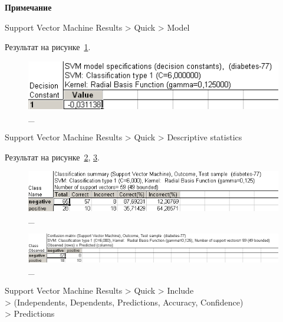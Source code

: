 \newpage

\begin{center}
  \textbf{Примечание}
\end{center}

Support Vector Machine Results > Quick > Model

Результат на рисунке~\ref{fig:v5_14}.

\begin{figure}[!h]
  \centering

  \includegraphics[width=12cm]
  {inc/v5_14.PNG}

  \caption{\_}

  \label{fig:v5_14}
\end{figure}

Support Vector Machine Results > Quick > Descriptive statistics

Результат на рисунке~\ref{fig:v5_15_1}, \ref{fig:v5_15_2}.

\begin{figure}[!h]
  \centering

  \includegraphics[width=18cm]
  {inc/v5_15_2.PNG}

  \caption{\_}

  \label{fig:v5_15_1}
\end{figure}

\begin{figure}[!h]
  \centering

  \includegraphics[width=18cm]
  {inc/v5_15.PNG}

  \caption{\_}

  \label{fig:v5_15_2}
\end{figure}

Support Vector Machine Results > Quick > Include \\
> (Independents, Dependents, Predictions, Accuracy, Confidence) \\
> Predictions

